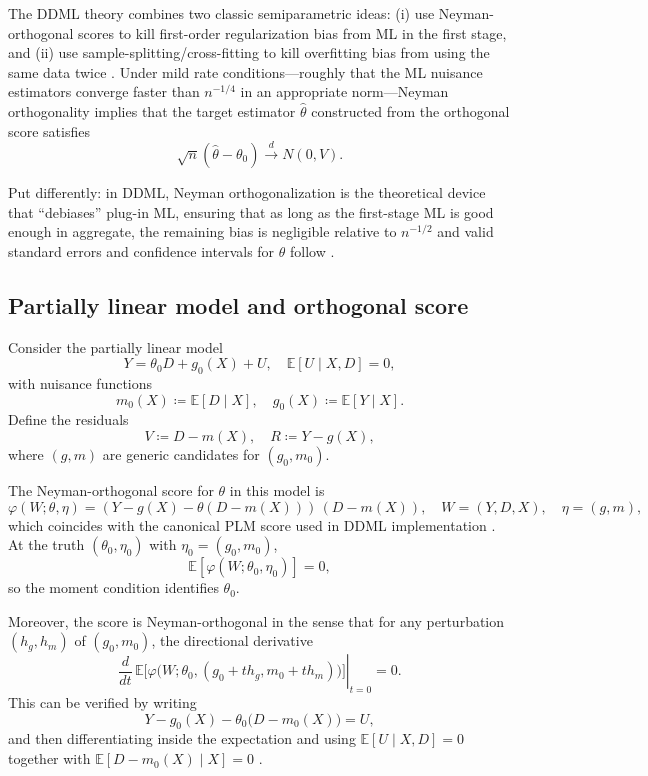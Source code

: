\documentclass [11pt]{article}
\theoremstyle{plain}
\theoremstyle{definition}
\theoremstyle{remark}
\newcommand{\1}{\bm{1}}
\newcommand{\E}{\mathbb{E}}
\begin{document}
\begin{appendices}
The DDML theory combines two classic semiparametric ideas: (i) use Neyman-orthogonal scores to kill first-order regularization bias from ML in the first stage, and (ii) use sample-splitting/cross-fitting to kill overfitting bias from using the same data twice \citep[Sec.~2]{chernozhukov2018dml}. Under mild rate conditions---roughly that the ML nuisance estimators converge faster than $n^{-1/4}$ in an appropriate norm---Neyman orthogonality implies that the target estimator $\hat{\theta}$ constructed from the orthogonal score satisfies
\[
\sqrt{n} (\hat{\theta} - \theta_0) \stackrel{d}{\to} N(0, V).
\]

Put differently: in DDML, Neyman orthogonalization is the theoretical device that ``debiases'' plug-in ML, ensuring that as long as the first-stage ML is good enough in aggregate, the remaining bias is negligible relative to $n^{-1/2}$ and valid standard errors and confidence intervals for $\theta$ follow \citep[Sec.~2.2]{doubleml2022}.

\subsection{Partially linear model and orthogonal score}

Consider the partially linear model
\[
Y = \theta_0 D + g_0(X) + U, \quad \E[U \mid X, D] = 0,
\]
with nuisance functions
\[
m_0(X) \coloneqq \E[D \mid X], \quad g_0(X) \coloneqq \E[Y \mid X].
\]
Define the residuals
\[
V \coloneqq D - m(X), \quad R \coloneqq Y - g(X),
\]
where $(g,m)$ are generic candidates for $(g_0,m_0)$.

The Neyman-orthogonal score for $\theta$ in this model is
\[
\varphi(W; \theta, \eta) = (Y - g(X) - \theta (D - m(X)))\,(D - m(X)), \quad W = (Y,D,X), \quad \eta = (g,m),
\]
which coincides with the canonical PLM score used in DDML implementation \citep[Sec.~2]{chernozhukov2018dml,doubleml2022}. At the truth $(\theta_0,\eta_0)$ with $\eta_0 = (g_0,m_0)$,
\[
\E[\varphi(W; \theta_0, \eta_0)] = 0,
\]
so the moment condition identifies $\theta_0$.

Moreover, the score is Neyman-orthogonal in the sense that for any perturbation $(h_g, h_m)$ of $(g_0,m_0)$, the directional derivative
\[
\left. \frac{d}{dt}\,\E\big[\varphi\big(W; \theta_0, (g_0 + t h_g, m_0 + t h_m)\big)\big] \right|_{t=0} = 0.
\]
This can be verified by writing
\[
Y - g_0(X) - \theta_0\bigl(D - m_0(X)\bigr) = U,
\]
and then differentiating inside the expectation and using $\E[U \mid X,D]=0$ together with $\E[D - m_0(X) \mid X]=0$ \citep[Sec.~2]{chernozhukov2018dml}.


\end{appendices}
\end{document}
